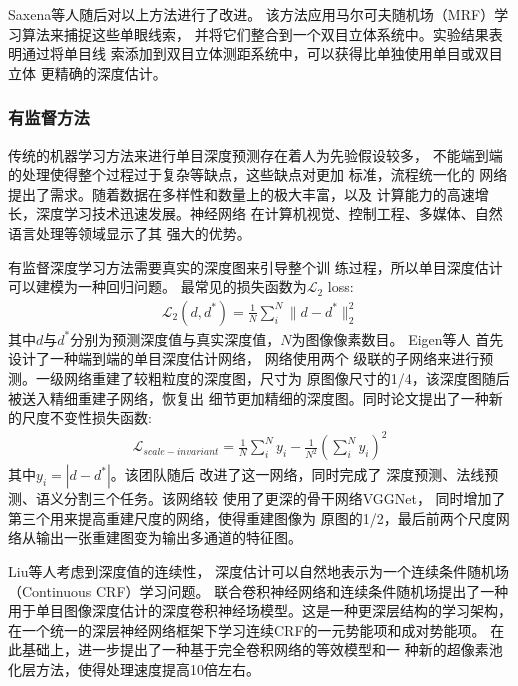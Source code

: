 Saxena等人\cite{saxena2007}随后对以上方法进行了改进。
该方法应用马尔可夫随机场（MRF）学习算法来捕捉这些单眼线索，
并将它们整合到一个双目立体系统中。实验结果表明通过将单目线
索添加到双目立体测距系统中，可以获得比单独使用单目或双目立体
更精确的深度估计。
\subsubsection{有监督方法}
传统的机器学习方法来进行单目深度预测存在着人为先验假设较多，
不能端到端的处理使得整个过程过于复杂等缺点，这些缺点对更加
标准，流程统一化的
网络提出了需求。随着数据在多样性和数量上的极大丰富，以及
计算能力的高速增长，深度学习技术迅速发展。神经网络
在计算机视觉、控制工程、多媒体、自然语言处理等领域显示了其
强大的优势。


有监督深度学习方法需要真实的深度图来引导整个训
练过程，所以单目深度估计
可以建模为一种回归问题。
最常见的损失函数为$\mathcal{L}_2$ loss:
\begin{align}
    \mathcal{L}_2(d,d^*) = 
    \frac{1}{N} \sum\limits_{i}^{N} \|d-d^*\|_2^2   
\end{align}
其中$d$与$d^*$分别为预测深度值与真实深度值，$N$为图像像素数目。
Eigen等人 \cite{eigen2014depth} 
首先设计了一种端到端的单目深度估计网络，
网络使用两个
级联的子网络来进行预测。一级网络重建了较粗粒度的深度图，尺寸为
原图像尺寸的1/4，该深度图随后被送入精细重建子网络，恢复出
细节更加精细的深度图。同时论文提出了一种新的尺度不变性损失函数:
\begin{align}
\mathcal{L}_{scale-invariant} = 
\frac{1}{N} \sum\limits_{i}^{N} y_i -\frac{1}{N^2} 
(\sum\limits_{i}^{N} y_i)^2
\end{align}
其中$y_i = |d-d^*|$。该团队随后
改进了这一网络\cite{eigenthreetasks}，同时完成了
深度预测、法线预测、语义分割三个任务。该网络较\cite{eigen2014depth}
使用了更深的骨干网络VGGNet\cite{vgg}，
同时增加了第三个用来提高重建尺度的网络，使得重建图像为
原图的1/2，最后前两个尺度网络从输出一张重建图变为输出多通道的特征图。

Liu等人\cite{liu2015learning}考虑到深度值的连续性，
深度估计可以自然地表示为一个连续条件随机场（Continuous CRF）学习问题。
联合卷积神经网络和连续条件随机场提出了一种
用于单目图像深度估计的深度卷积神经场模型。这是一种更深层结构的学习架构，
在一个统一的深层神经网络框架下学习连续CRF的一元势能项和成对势能项。
在此基础上，进一步提出了一种基于完全卷积网络的等效模型和一
种新的超像素池化层方法，使得处理速度提高10倍左右。

